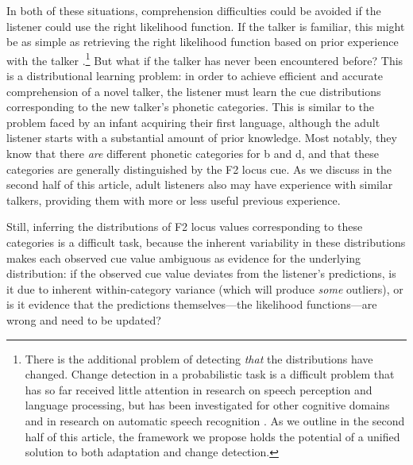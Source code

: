 In both of these situations, comprehension difficulties could be avoided if the listener could use the right likelihood function.  If the talker is familiar, this might be as simple as retrieving the right likelihood function based on prior experience with the talker \autocite[cf.][]{Goldinger1998}.\footnote{There is the additional problem of detecting {\em that} the distributions have changed. Change detection in a probabilistic task is a difficult problem that has so far received little attention in research on speech perception and language processing, but has been investigated for other cognitive domains \autocite[for a review of the literature, see][]{Qian2012} and in research on automatic speech recognition \autocite[e.g.,][]{Ajmera2004,Chen1998}. As we outline in the second half of this article,  the framework we propose holds the potential of a unified solution to both adaptation and change detection.}
But what if the talker has never been encountered before?  This is a distributional learning problem: in order to achieve efficient and accurate comprehension of a novel talker, the listener must learn the cue distributions corresponding to the new talker's phonetic categories.  This is similar to the problem faced by an infant acquiring their first language, although the adult listener starts with a substantial amount of prior knowledge.  Most notably, they know that there \emph{are} different phonetic categories for \ph b and \ph d, and that these categories are generally distinguished by the F2 locus cue.  As we discuss in the second half of this article, adult listeners also may have experience with similar talkers, providing them with more or less useful previous experience.

Still, inferring the distributions of F2 locus values corresponding to these categories is a difficult task, because the inherent variability in these distributions makes each observed cue value ambiguous as evidence for the underlying distribution: if the observed cue value deviates from the listener's predictions, is it due to inherent within-category variance (which will produce \emph{some} outliers), or is it evidence that the predictions themselves---the likelihood functions---are wrong and need to be updated?

